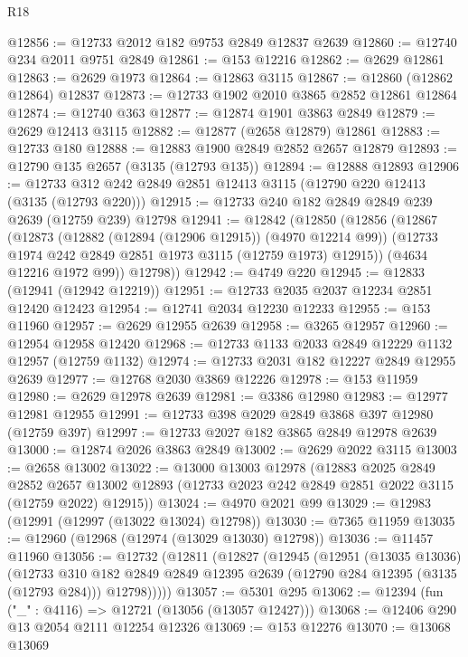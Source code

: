\begin{lexlean}{R18}
\begin{coremodule}
@12856 := @12733 @2012 @182 @9753 @2849 @12837 @2639
@12860 := @12740 @234 @2011 @9751 @2849
@12861 := @153 @12216
@12862 := @2629 @12861
@12863 := @2629 @1973
@12864 := @12863 @3115
@12867 := @12860 (@12862 @12864) @12837
@12873 := @12733 @1902 @2010 @3865 @2852 @12861 @12864
@12874 := @12740 @363
@12877 := @12874 @1901 @3863 @2849
@12879 := @2629 @12413 @3115
@12882 := @12877 (@2658 @12879) @12861
@12883 := @12733 @180
@12888 := @12883 @1900 @2849 @2852 @2657 @12879
@12893 := @12790 @135 @2657 (@3135 (@12793 @135))
@12894 := @12888 @12893
@12906 := @12733 @312 @242 @2849 @2851 @12413 @3115 (@12790 @220 @12413 (@3135 (@12793 @220)))
@12915 := @12733 @240 @182 @2849 @2849 @239 @2639 (@12759 @239) @12798
@12941 := @12842
    (@12850
      (@12856
        (@12867
          (@12873
            (@12882 (@12894 (@12906 @12915)) (@4970 @12214 @99))
            (@12733 @1974 @242 @2849 @2851 @1973 @3115 (@12759 @1973) @12915))
          (@4634 @12216 @1972 @99))
        @12798))
@12942 := @4749 @220
@12945 := @12833 (@12941 (@12942 @12219))
@12951 := @12733 @2035 @2037 @12234 @2851 @12420 @12423
@12954 := @12741 @2034 @12230 @12233
@12955 := @153 @11960
@12957 := @2629 @12955 @2639
@12958 := @3265 @12957
@12960 := @12954 @12958 @12420
@12968 := @12733 @1133 @2033 @2849 @12229 @1132 @12957 (@12759 @1132)
@12974 := @12733 @2031 @182 @12227 @2849 @12955 @2639
@12977 := @12768 @2030 @3869 @12226
@12978 := @153 @11959
@12980 := @2629 @12978 @2639
@12981 := @3386 @12980
@12983 := @12977 @12981 @12955
@12991 := @12733 @398 @2029 @2849 @3868 @397 @12980 (@12759 @397)
@12997 := @12733 @2027 @182 @3865 @2849 @12978 @2639
@13000 := @12874 @2026 @3863 @2849
@13002 := @2629 @2022 @3115
@13003 := @2658 @13002
@13022 := @13000
    @13003
    @12978
    (@12883
      @2025
      @2849
      @2852
      @2657
      @13002
      @12893
      (@12733 @2023 @242 @2849 @2851 @2022 @3115 (@12759 @2022) @12915))
@13024 := @4970 @2021 @99
@13029 := @12983 (@12991 (@12997 (@13022 @13024) @12798))
@13030 := @7365 @11959
@13035 := @12960 (@12968 (@12974 (@13029 @13030) @12798))
@13036 := @11457 @11960
@13056 := @12732
    (@12811
      (@12827
        (@12945
          (@12951
            (@13035 @13036)
            (@12733
              @310
              @182
              @2849
              @2849
              @12395
              @2639
              (@12790 @284 @12395 (@3135 (@12793 @284)))
              @12798)))))
@13057 := @5301 @295
@13062 := @12394 (fun ("_" : @4116) => @12721 (@13056 (@13057 @12427)))
@13068 := @12406 @290 @13 @2054 @2111 @12254 @12326
@13069 := @153 @12276
@13070 := @13068 @13069

\end{coremodule}
\end{lexlean}
